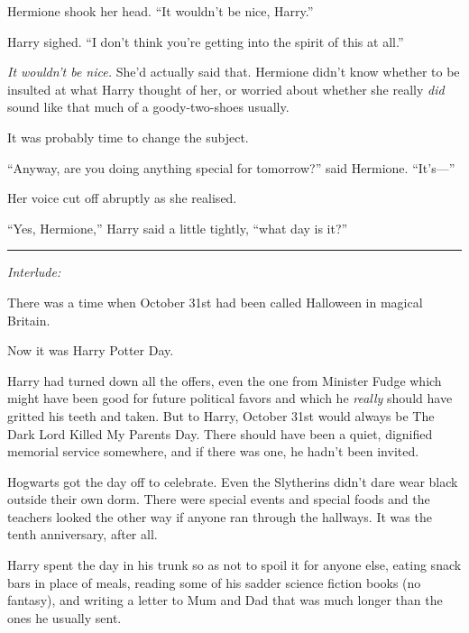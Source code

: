 Hermione shook her head. ``It wouldn't be nice, Harry.''

Harry sighed. ``I don't think you're getting into the spirit of this at
all.''

\emph{It wouldn't be nice.} She'd actually said that. Hermione didn't
know whether to be insulted at what Harry thought of her, or worried
about whether she really \emph{did} sound like that much of a
goody-two-shoes usually.

It was probably time to change the subject.

``Anyway, are you doing anything special for tomorrow?'' said Hermione.
``It's---''

Her voice cut off abruptly as she realised.

``Yes, Hermione,'' Harry said a little tightly, ``what day is it?''

\begin{center}\rule{3in}{0.4pt}\end{center}

\emph{Interlude:}

There was a time when October 31st had been called Halloween in magical
Britain.

Now it was Harry Potter Day.

Harry had turned down all the offers, even the one from Minister Fudge
which might have been good for future political favors and which he
\emph{really} should have gritted his teeth and taken. But to Harry,
October 31st would always be The Dark Lord Killed My Parents Day. There
should have been a quiet, dignified memorial service somewhere, and if
there was one, he hadn't been invited.

Hogwarts got the day off to celebrate. Even the Slytherins didn't dare
wear black outside their own dorm. There were special events and special
foods and the teachers looked the other way if anyone ran through the
hallways. It was the tenth anniversary, after all.

Harry spent the day in his trunk so as not to spoil it for anyone else,
eating snack bars in place of meals, reading some of his sadder science
fiction books (no fantasy), and writing a letter to Mum and Dad that was
much longer than the ones he usually sent.
